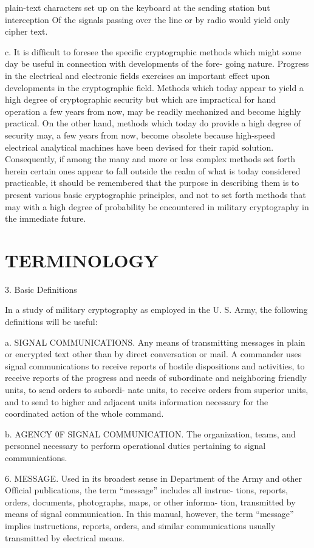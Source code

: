 plain-text characters set up on the keyboard at the sending station but
interception Of the signals passing over the line or by radio would yield
only cipher text.

c. It is difﬁcult to foresee the speciﬁc cryptographic methods which
might some day be useful in connection with developments of the fore-
going nature. Progress in the electrical and electronic ﬁelds exercises an
important effect upon developments in the cryptographic ﬁeld. Methods
which today appear to yield a high degree of cryptographic security but
which are impractical for hand operation a few years from now, may be
readily mechanized and become highly practical. On the other hand,
methods which today do provide a high degree of security may, a few
years from now, become obsolete because high-speed electrical analytical
machines have been devised for their rapid solution. Consequently, if
among the many and more or less complex methods set forth herein
certain ones appear to fall outside the realm of what is today considered
practicable, it should be remembered that the purpose in describing them
is to present various basic cryptographic principles, and not to set forth
methods that may with a high degree of probability be encountered in
military cryptography in the immediate future.

\section{TERMINOLOGY}

3. Basic Deﬁnitions

In a study of military cryptography as employed in the U. S. Army,
the following deﬁnitions will be useful:

a. SIGNAL COMMUNICATIONS. Any means of transmitting messages
in plain or encrypted text other than by direct conversation or mail. A
commander uses signal communications to receive reports of hostile
dispositions and activities, to receive reports of the progress and needs
of subordinate and neighboring friendly units, to send orders to subordi-
nate units, to receive orders from superior units, and to send to higher
and adjacent units information necessary for the coordinated action of
the whole command.

b. AGENCY 0F SIGNAL COMMUNICATION. The organization, teams, and
personnel necessary to perform operational duties pertaining to signal
communications.

6. MESSAGE. Used in its broadest sense in Department of the Army
and other Ofﬁcial publications, the term “message” includes all instruc-
tions, reports, orders, documents, photographs, maps, or other informa-
tion, transmitted by means of signal communication. In this manual,
however, the term “message” implies instructions, reports, orders, and
similar communications usually transmitted by electrical means.

